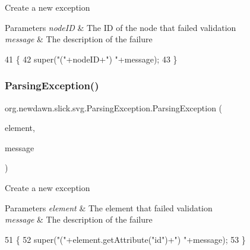 Create a new exception


\begin{DoxyParams}{Parameters}
{\em node\+ID} & The ID of the node that failed validation \\
\hline
{\em message} & The description of the failure \\
\hline
\end{DoxyParams}

\begin{DoxyCode}
41                                                            \{
42         super(\textcolor{stringliteral}{"("}+nodeID+\textcolor{stringliteral}{") "}+message);
43     \}
\end{DoxyCode}
\mbox{\label{classorg_1_1newdawn_1_1slick_1_1svg_1_1_parsing_exception_ad4eb7a21ccceb0510a682da92e717aa9}} 
\subsubsection{\texorpdfstring{Parsing\+Exception()}{ParsingException()}\hspace{0.1cm}{\footnotesize\ttfamily [4/4]}}
{\footnotesize\ttfamily org.\+newdawn.\+slick.\+svg.\+Parsing\+Exception.\+Parsing\+Exception (\begin{DoxyParamCaption}\item[{Element}]{element,  }\item[{String}]{message }\end{DoxyParamCaption})\hspace{0.3cm}{\ttfamily [inline]}}

Create a new exception


\begin{DoxyParams}{Parameters}
{\em element} & The element that failed validation \\
\hline
{\em message} & The description of the failure \\
\hline
\end{DoxyParams}

\begin{DoxyCode}
51                                                              \{
52         super(\textcolor{stringliteral}{"("}+element.getAttribute(\textcolor{stringliteral}{"id"})+\textcolor{stringliteral}{") "}+message);
53     \}
\end{DoxyCode}
